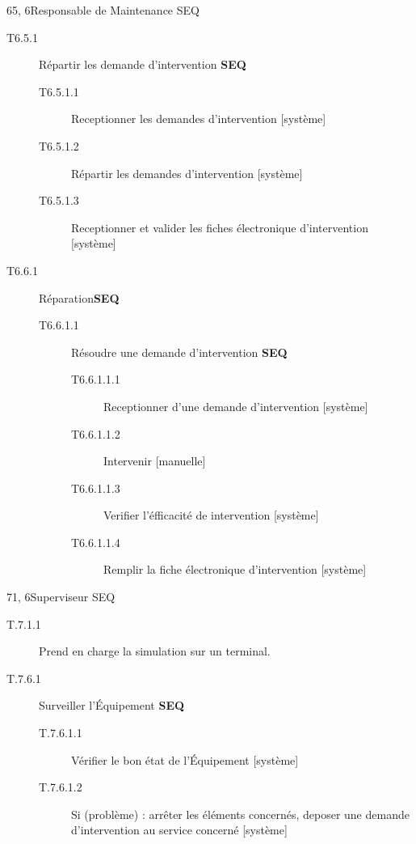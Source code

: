 \dta
{6}{5, 6}{Responsable de Maintenance}
{SEQ}
{
\begin{description}
	\item[T6.5.1] Répartir les demande d'intervention \textbf{SEQ}
	\begin{description}
		\item[T6.5.1.1] Receptionner les demandes d'intervention [système]
		\item[T6.5.1.2] Répartir les demandes d'intervention [système]
		\item[T6.5.1.3] Receptionner et valider les fiches électronique d'intervention [système]
	\end{description}

	\item[T6.6.1] Réparation\textbf{SEQ}
	\begin{description}
		\item[T6.6.1.1] Résoudre une demande d'intervention \textbf{SEQ}
		\begin{description}
			\item[T6.6.1.1.1] Receptionner d'une demande d'intervention [système]
			\item[T6.6.1.1.2] Intervenir [manuelle]
			\item[T6.6.1.1.3] Verifier l'éfficacité de intervention [système]
			\item[T6.6.1.1.4] Remplir la fiche électronique d'intervention [système]
		\end{description}
	\end{description}
\end{description}
}

\dta
{7}{1, 6}{Superviseur}
{SEQ}
{
\begin{description}
	\item[T.7.1.1] Prend en charge la simulation sur un terminal.
	
	\item[T.7.6.1] Surveiller l'Équipement \textbf{SEQ}
	\begin{description}
		\item[T.7.6.1.1] Vérifier le bon état de l'Équipement [système]
		\item[T.7.6.1.2] Si (problème) : arrêter les éléments concernés, deposer une demande d'intervention au service concerné [système]
	\end{description}
\end{description}
}


